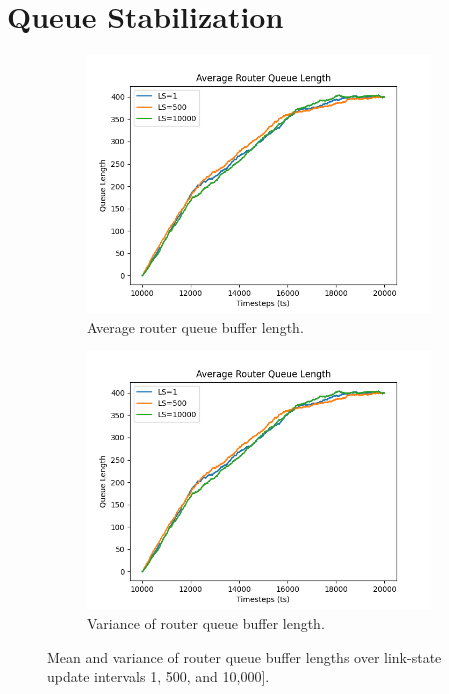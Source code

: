 \section{Queue Stabilization}
\label{sec:Aqueuestabilization}


\captionsetup{justification=centering}
\begin{figure}[H]
    \centering
    \begin{subfigure}{0.475\textwidth}
        \includegraphics[width=\textwidth]{figs/results/average_of_1,500,10000.png}
        \caption{Average router queue buffer length.}
        \label{fig:Ravgq}
    \end{subfigure}
    \hfill
    \begin{subfigure}{0.475\textwidth}
        \includegraphics[width=\textwidth]{figs/results/average_of_1,500,10000.png}
        \caption[]{Variance of router queue buffer length.}
        \label{fig:Rvarq}
    \end{subfigure}
    \caption{Mean and variance of router queue buffer lengths over link-state update intervals 1, 500, and 10,000].}
\end{figure}

